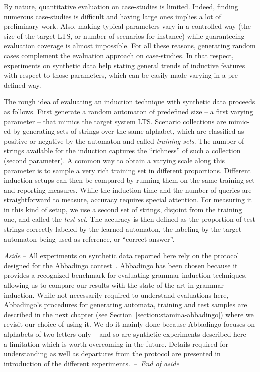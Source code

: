 By nature, quantitative evaluation on case-studies is limited. Indeed, finding numerous case-studies is difficult and having large ones implies a lot of preliminary work. Also, making typical parameters vary in a controlled way (the size of the target LTS, or number of scenarios for instance) while guaranteeing evaluation coverage is almost impossible. For all these reasons, generating random cases complement the evaluation approach on case-studies. In that respect, experiments on synthetic data help stating general trends of inductive features with respect to those parameters, which can be easily made varying in a pre-defined way.

The rough idea of evaluating an induction technique with synthetic data proceeds as follows. First generate a random automaton of predefined size -- a first varying parameter -- that mimics the target system LTS. Scenario collections are mimic-ed by generating sets of strings over the same alphabet, which are classified as positive or negative by the automaton and called \emph{training sets}. The number of strings available for the induction captures the ``richness'' of such a collection (second parameter). A common way to obtain a varying scale along this parameter is to sample a very rich training set in different proportions. Different induction setups can then be compared by running them on the same training set and reporting measures. While the induction time and the number of queries are straightforward to measure, accuracy requires special attention. For measuring it in this kind of setup, we use a second set of strings, disjoint from the training one, and called the \emph{test set}. The accuracy is then defined as the proportion of test strings correctly labeled by the learned automaton, the labeling by the target automaton being used as reference, or ``correct answer''. 

\emph{Aside} -- All experiments on synthetic data reported here rely on the protocol designed for the Abbadingo contest~\cite{Lang:1998}. Abbadingo has been chosen because it provides a recognized benchmark for evaluating grammar induction techniques, allowing us to compare our results with the state of the art in grammar induction. While not necessarily required to understand evaluations here, Abbadingo's procedures for generating automata, training and test samples are described in the next chapter (see Section~\ref{section:stamina-abbadingo}) where we revisit our choice of using it. We do it mainly done because Abbadingo focuses on alphabets of two letters only -- and so are synthetic experiments described here -- a limitation which is worth overcoming in the future. Details required for understanding as well as departures from the protocol are presented in introduction of the different experiments.~--~\emph{End of aside}

